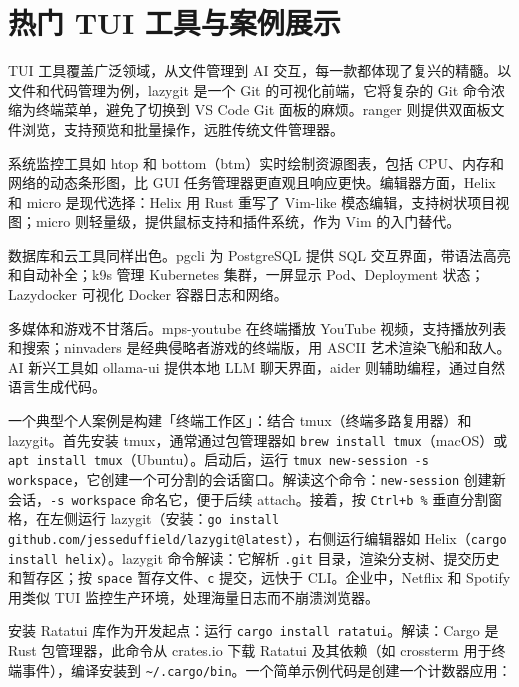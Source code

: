 \chapter{热门 TUI 工具与案例展示}
TUI 工具覆盖广泛领域，从文件管理到 AI 交互，每一款都体现了复兴的精髓。以文件和代码管理为例，lazygit 是一个 Git 的可视化前端，它将复杂的 Git 命令浓缩为终端菜单，避免了切换到 VS Code Git 面板的麻烦。ranger 则提供双面板文件浏览，支持预览和批量操作，远胜传统文件管理器。\par
系统监控工具如 htop 和 bottom（btm）实时绘制资源图表，包括 CPU、内存和网络的动态条形图，比 GUI 任务管理器更直观且响应更快。编辑器方面，Helix 和 micro 是现代选择：Helix 用 Rust 重写了 Vim-like 模态编辑，支持树状项目视图；micro 则轻量级，提供鼠标支持和插件系统，作为 Vim 的入门替代。\par
数据库和云工具同样出色。pgcli 为 PostgreSQL 提供 SQL 交互界面，带语法高亮和自动补全；k9s 管理 Kubernetes 集群，一屏显示 Pod、Deployment 状态；Lazydocker 可视化 Docker 容器日志和网络。\par
多媒体和游戏不甘落后。mps-youtube 在终端播放 YouTube 视频，支持播放列表和搜索；ninvaders 是经典侵略者游戏的终端版，用 ASCII 艺术渲染飞船和敌人。AI 新兴工具如 ollama-ui 提供本地 LLM 聊天界面，aider 则辅助编程，通过自然语言生成代码。\par
一个典型个人案例是构建「终端工作区」：结合 tmux（终端多路复用器）和 lazygit。首先安装 tmux，通常通过包管理器如 \texttt{brew install tmux}（macOS）或 \texttt{apt install tmux}（Ubuntu）。启动后，运行 \texttt{tmux new-session -s workspace}，它创建一个可分割的会话窗口。解读这个命令：\texttt{new-session} 创建新会话，\texttt{-s workspace} 命名它，便于后续 attach。接着，按 \texttt{Ctrl+b \%{}} 垂直分割窗格，在左侧运行 lazygit（安装：\texttt{go install github.com/jesseduffield/lazygit@latest}），右侧运行编辑器如 Helix（\texttt{cargo install helix}）。lazygit 命令解读：它解析 \texttt{.git} 目录，渲染分支树、提交历史和暂存区；按 \texttt{space} 暂存文件、\texttt{c} 提交，远快于 CLI。企业中，Netflix 和 Spotify 用类似 TUI 监控生产环境，处理海量日志而不崩溃浏览器。\par
安装 Ratatui 库作为开发起点：运行 \texttt{cargo install ratatui}。解读：Cargo 是 Rust 包管理器，此命令从 crates.io 下载 Ratatui 及其依赖（如 crossterm 用于终端事件），编译安装到 \texttt{\~{}/.cargo/bin}。一个简单示例代码是创建一个计数器应用：\par
